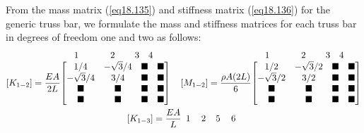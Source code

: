 \documentclass{AeroStructure-ERJohnson}
\begin{document}
\begin{example}
From the mass matrix (\ref{eq18.135}) and stiffness matrix (\ref{eq18.136}) for the generic truss bar, we formulate the mass and stiffness matrices for each truss bar in degrees of freedom one and two as follows:
\begin{gather}
\left[K_{1-2}\right]=\frac{E A}{2 L}
\begin{array}[b]{@{}l@{}}
\begin{array}{@{}l}
\hspace*{15pt}1 \hspace*{35pt}2 \hspace*{22pt}3 \hspace*{10pt}4
\end{array}\\
\left[\begin{array}{@{}cccc@{}}1/4 & -\sqrt{3}/4 & \blacksquare & \blacksquare \\
-\sqrt{3}/4 & 3/4 & \blacksquare & \blacksquare \\
\blacksquare & \blacksquare & \blacksquare & \blacksquare\\
\blacksquare & \blacksquare & \blacksquare & \blacksquare
\end{array}\right]\end{array} \quad\left[M_{1-2}\right]=\frac{\rho A(2 L)}{6}
\begin{array}[b]{@{}l@{}}
\begin{array}{@{}l}
\hspace*{15pt}1 \hspace*{35pt}2 \hspace*{22pt}3 \hspace*{10pt}4
\end{array}\\
\left[\begin{array}{@{}cccc@{}}1/2 & -\sqrt{3}/2 & \blacksquare & \blacksquare\\
-\sqrt{3}/2 & 3/2 & \blacksquare& \blacksquare\\
\blacksquare & \blacksquare & \blacksquare & \blacksquare\\
\blacksquare & \blacksquare & \blacksquare & \blacksquare
\end{array}\right]
\end{array}\label{ex18.3a}\\
\left[K_{1-3}\right]=\frac{E A}{L}
\begin{array}[b]{@{}l@{}}
\begin{array}{@{}l}
\hspace*{5pt}1 \hspace*{12pt}2 \hspace*{11pt}5 \hspace*{12pt}6

\end{array}
\end{array}
\end{gather}
\end{example}
\end{document}
